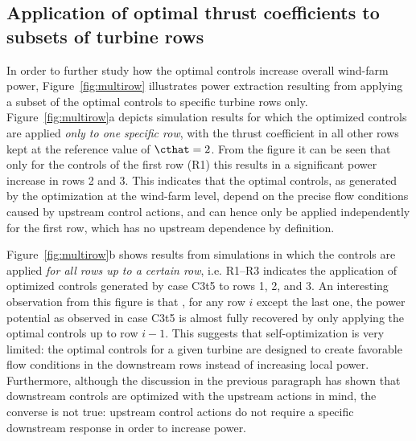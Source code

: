 	\subsection{Application of optimal thrust coefficients to subsets of turbine rows}\label{sec:application_subset}

	In order to further study how the optimal controls increase overall wind-farm power, Figure~\ref{fig:multirow} illustrates power extraction resulting from applying a subset of the optimal controls to specific turbine rows only. Figure~\ref{fig:multirow}a depicts simulation results for which the  optimized controls are applied \emph{only to one specific row}, with the thrust coefficient in all other rows kept at the reference value of $\cthat = 2$. From the figure it can be seen that only for the controls of the first row (R1) this results in a significant power increase in rows 2 and 3. This indicates that the optimal controls, as generated by the optimization at the wind-farm level, depend on the precise flow conditions caused by upstream control actions, and can hence only be applied independently for the first row, which has no upstream dependence by definition. 
	
	Figure~\ref{fig:multirow}b shows results from simulations in which the controls are applied \emph{for all rows up to a certain row}, i.e. R1--R3 indicates the application of optimized controls generated by case C3t5 to rows 1, 2, and 3. An interesting observation from this figure is that , for any row $i$ except the last one, the power potential as observed in case C3t5 is almost fully recovered by only applying the optimal controls up to row $i-1$. This suggests that self-optimization is very limited: the optimal controls for a given turbine are designed to create favorable flow conditions in the downstream rows instead of increasing local power. Furthermore, although the discussion in the previous paragraph has shown that downstream controls are optimized with the upstream actions in mind, the converse is not true: upstream control actions do not require a specific downstream response in order to increase power. 
	
